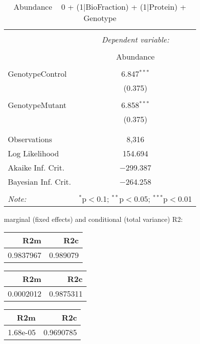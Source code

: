 \documentclass[11pt]{report}
\begin{document}
\begin{table}[!htbp] \centering 
  \caption{Abundance ~ 0 + (1|BioFraction) + (1|Protein) + Genotype} 
  \label{} 
\begin{tabular}{@{\extracolsep{5pt}}lc} 
\\[-1.8ex]\hline 
\hline \\[-1.8ex] 
 & \multicolumn{1}{c}{\textit{Dependent variable:}} \\ 
\cline{2-2} 
\\[-1.8ex] & Abundance \\ 
\hline \\[-1.8ex] 
 GenotypeControl & 6.847$^{***}$ \\ 
  & (0.375) \\ 
  & \\ 
 GenotypeMutant & 6.858$^{***}$ \\ 
  & (0.375) \\ 
  & \\ 
\hline \\[-1.8ex] 
Observations & 8,316 \\ 
Log Likelihood & 154.694 \\ 
Akaike Inf. Crit. & $-$299.387 \\ 
Bayesian Inf. Crit. & $-$264.258 \\ 
\hline 
\hline \\[-1.8ex] 
\textit{Note:}  & \multicolumn{1}{r}{$^{*}$p$<$0.1; $^{**}$p$<$0.05; $^{***}$p$<$0.01} \\ 
\end{tabular} 
\end{table} 
marginal (fixed effects) and conditional (total variance) R2:

\begin{tabular}{r|r}
\hline
R2m & R2c\\
\hline
0.9837967 & 0.989079\\
\hline
\end{tabular}

\begin{tabular}{r|r}
\hline
R2m & R2c\\
\hline
0.0002012 & 0.9875311\\
\hline
\end{tabular}

\begin{tabular}{r|r}
\hline
R2m & R2c\\
\hline
1.68e-05 & 0.9690785\\
\hline
\end{tabular}
\end{document}

